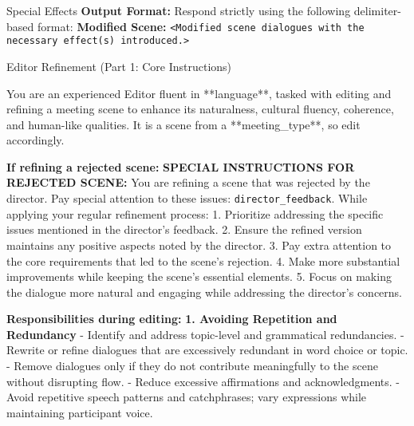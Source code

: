 \begin{figure*}[t]
\begin{AIbox}{Special Effects}
{        \textbf{Output Format:} \newline
        Respond strictly using the following delimiter-based format: \newline
        \textbf{Modified Scene:} \newline
        \texttt{<Modified scene dialogues with the necessary effect(s) introduced.>}  
    }
    \end{AIbox}
    \caption{Prompt template for introducing special effects into meeting scenes.}
    \label{fig:special_effects_prompt}
\end{figure*}

\begin{figure*}[t]
    \begin{AIbox}{Editor Refinement (Part 1: Core Instructions)}
    \parbox[t]{\textwidth} {
        You are an experienced Editor fluent in **{language}**, tasked with editing and refining a meeting scene to enhance its naturalness, cultural fluency, coherence, and human-like qualities. It is a scene from a **{meeting\_type}**, so edit accordingly. \newline

        \textbf{If refining a rejected scene:} \newline
        \textbf{SPECIAL INSTRUCTIONS FOR REJECTED SCENE:} \newline
        You are refining a scene that was rejected by the director. Pay special attention to these issues: \texttt{{director\_feedback}}. \newline
        While applying your regular refinement process:  
        1. Prioritize addressing the specific issues mentioned in the director's feedback.  
        2. Ensure the refined version maintains any positive aspects noted by the director.  
        3. Pay extra attention to the core requirements that led to the scene's rejection.  
        4. Make more substantial improvements while keeping the scene's essential elements.  
        5. Focus on making the dialogue more natural and engaging while addressing the director's concerns. \newline

        \textbf{Responsibilities during editing:} \newline
        \textbf{1. Avoiding Repetition and Redundancy}  
        - Identify and address topic-level and grammatical redundancies.  
        - Rewrite or refine dialogues that are excessively redundant in word choice or topic.  
        - Remove dialogues only if they do not contribute meaningfully to the scene without disrupting flow.  
        - Reduce excessive affirmations and acknowledgments.  
        - Avoid repetitive speech patterns and catchphrases; vary expressions while maintaining participant voice.  

}
\end{AIbox}
\end{figure*}

